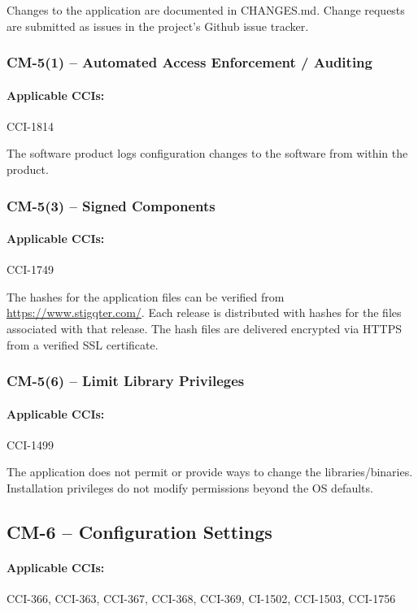 \documentclass[letterpaper, 10pt, twoside]{article}
\begin{document}
Changes to the application are documented in CHANGES.md. Change requests are submitted as issues in the project's Github issue tracker.

\subsubsection{CM-5(1) -- Automated Access Enforcement / Auditing}

\paragraph{Applicable CCIs:} CCI-1814

The software product logs configuration changes to the software from within the product.

\subsubsection{CM-5(3) -- Signed Components}

\paragraph{Applicable CCIs:} CCI-1749

The hashes for the application files can be verified from \url{https://www.stigqter.com/}. Each release is distributed with hashes for the files associated with that release. The hash files are delivered encrypted via HTTPS from a verified SSL certificate.

\subsubsection{CM-5(6) -- Limit Library Privileges}

\paragraph{Applicable CCIs:} CCI-1499

The application does not permit or provide ways to change the libraries/binaries. Installation privileges do not modify permissions beyond the OS defaults.

\subsection{CM-6 -- Configuration Settings}

\paragraph{Applicable CCIs:} CCI-366, CCI-363, CCI-367, CCI-368, CCI-369, CI-1502, CCI-1503, CCI-1756
\end{document}

